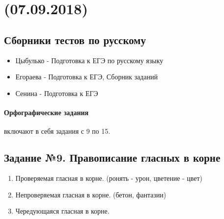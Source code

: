 \documentclass{article}
\author{SDL}
\begin{document}
\noindent\makebox[\textwidth]{\rule{\paperwidth}{0.4pt}}
\section{(07.09.2018)}
\noindent\makebox[\textwidth]{\rule{\paperwidth}{0.4pt}}

\subsection{Сборники тестов по русскому}
\begin{itemize}
\item
  Цыбулько - Подготовка к ЕГЭ по русскому языку
\item
  Егораева - Подготовка к ЕГЭ, Сборник заданий
\item
  Сенина - Подготовка к ЕГЭ
\end{itemize}

\paragraph{Орфографические задания} включают в себя задания с 9 по 15.

\subsection{Задание №9. Правописание гласных в корне}

\begin{enumerate}
\item
  Проверяемая гласная в корне. (ронять - урон, цветение - цвет)
\item
  Непроверяемая гласная в корне. (бетон, фантазии)
\item
  Чередующаяся гласная в корне.
\end{enumerate}
\end{document}
